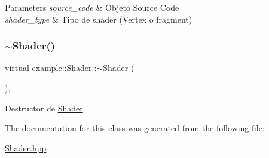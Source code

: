 \begin{DoxyParams}{Parameters}
{\em source\+\_\+code} & Objeto Source Code \\
\hline
{\em shader\+\_\+type} & Tipo de shader (Vertex o fragment) \\
\hline
\end{DoxyParams}
\mbox{\label{classexample_1_1_shader_a4f124fe7a6be5cfd78bd6e2ee84ca55f}} 
\subsubsection{\texorpdfstring{$\sim$Shader()}{~Shader()}}
{\footnotesize\ttfamily virtual example\+::\+Shader\+::$\sim$\+Shader (\begin{DoxyParamCaption}{ }\end{DoxyParamCaption})\hspace{0.3cm}{\ttfamily [protected]}, {\ttfamily [virtual]}}



Destructor de \mbox{\hyperlink{classexample_1_1_shader}{Shader}}. 



The documentation for this class was generated from the following file\+:\begin{DoxyCompactItemize}
\item 
\mbox{\hyperlink{_shader_8hpp}{Shader.\+hpp}}\end{DoxyCompactItemize}
